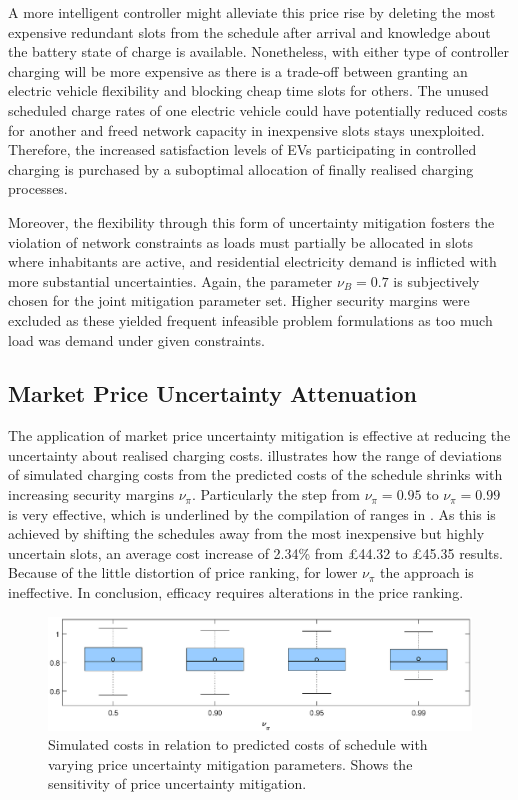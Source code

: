 \newpage
A more intelligent controller might alleviate this price rise by deleting the most expensive redundant slots from the schedule after arrival and knowledge about the battery state of charge is available. Nonetheless, with either type of controller charging will be more expensive as there is a trade-off between granting an electric vehicle flexibility and blocking cheap time slots for others. The unused scheduled charge rates of one electric vehicle could have potentially reduced costs for another and freed network capacity in inexpensive slots stays unexploited. Therefore, the increased satisfaction levels of EVs participating in controlled charging is purchased by a suboptimal allocation of finally realised charging processes.

Moreover, the flexibility through this form of uncertainty mitigation fosters the violation of network constraints as loads must partially be allocated in slots where inhabitants are active, and residential electricity demand is inflicted with more substantial uncertainties. Again, the parameter $\nu_{B}=0.7$ is subjectively chosen for the joint mitigation parameter set. Higher security margins were excluded as these yielded frequent infeasible problem formulations as too much load was demand under given constraints.

\subsection{Market Price Uncertainty Attenuation}

The application of market price uncertainty mitigation is effective at reducing the uncertainty about realised charging costs.  illustrates how the range of deviations of simulated charging costs from the predicted costs of the schedule shrinks with increasing security margins $\nu_{\pi}$. Particularly the step from $\nu_\pi=0.95$ to $\nu_\pi=0.99$ is very effective, which is underlined by the compilation of ranges in . As this is achieved by shifting the schedules away from the most inexpensive but highly uncertain slots, an average cost increase of 2.34\% from \pounds 44.32 to \pounds 45.35 results. Because of the little distortion of price ranking, for lower $\nu_{\pi}$ the approach is ineffective. In conclusion, efficacy requires alterations in the price ranking.

\begin{figure}[]
	\includegraphics[width=\textwidth,trim={2.9cm 0cm 2.5cm 0cm},clip]{figures/evaluation/lp_pr2.eps}
	\caption[Sensitivity of price uncertainty mitigation parameters]{Simulated costs in relation to predicted costs of schedule with varying price uncertainty mitigation parameters. Shows the sensitivity of price uncertainty mitigation.}
	\label{fig:lppr}
\end{figure}

